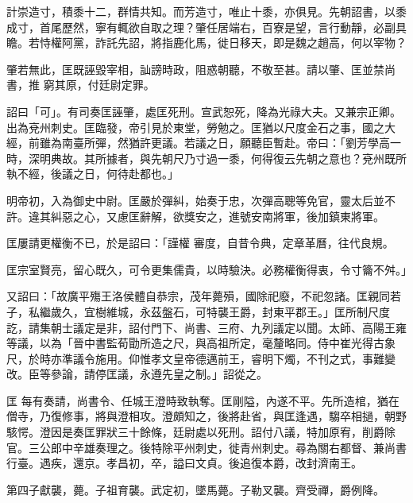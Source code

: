 \begin{pinyinscope}
 計崇造寸，積黍十二，群情共知。而芳造寸，唯止十黍，亦俱見。先朝詔書，以黍成寸，首尾歷然，寧有輒欲自取之理？肇任居端右，百寮是望，言行動靜，必副具瞻。若恃權阿黨，詐託先詔，將指鹿化馬，徙日移天，即是魏之趙高，何以宰物？



 肇若無此，匡既誣毀宰相，訕謗時政，阻惑朝聽，不敬至甚。請以肇、匡並禁尚書，推
 窮其原，付廷尉定罪。



 詔曰「可」。有司奏匡誣肇，處匡死刑。宣武恕死，降為光祿大夫。又兼宗正卿。出為兗州刺史。匡臨發，帝引見於東堂，勞勉之。匡猶以尺度金石之事，國之大經，前雖為南臺所彈，然猶許更議。若議之日，願聽臣暫赴。帝曰：「劉芳學高一時，深明典故。其所據者，與先朝尺乃寸過一黍，何得復云先朝之意也？兗州既所執不經，後議之日，何待赴都也。」



 明帝初，入為御史中尉。匡嚴於彈糾，始奏于忠，次彈高聰等免官，靈太后並不許。違其糾惡之心，又慮匡辭解，欲獎安之，進號安南將軍，後加鎮東將軍。



 匡屢請更權衡不已，於是詔曰：「謹權
 審度，自昔令典，定章革曆，往代良規。



 匡宗室賢亮，留心既久，可令更集儒貴，以時驗決。必務權衡得衷，令寸籥不舛。」



 又詔曰：「故廣平殤王洛侯體自恭宗，茂年薨殞，國除祀廢，不祀忽諸。匡親同若子，私繼歲久，宜樹維城，永茲盤石，可特襲王爵，封東平郡王。」匡所制尺度訖，請集朝士議定是非，詔付門下、尚書、三府、九列議定以聞。太師、高陽王雍等議，以為「晉中書監荀勖所造之尺，與高祖所定，毫釐略同。侍中崔光得古象尺，於時亦準議令施用。仰惟孝文皇帝德邁前王，睿明下燭，不刊之式，事難變改。臣等參論，請停匡議，永遵先皇之制。」詔從之。



 匡
 每有奏請，尚書令、任城王澄時致執奪。匡剛隘，內遂不平。先所造棺，猶在僧寺，乃復修事，將與澄相攻。澄頗知之，後將赴省，與匡逢遇，騶卒相撾，朝野駭愕。澄因是奏匡罪狀三十餘條，廷尉處以死刑。詔付八議，特加原宥，削爵除官。三公郎中辛雄奏理之。後特除平州刺史，徙青州刺史。尋為關右都督、兼尚書行臺。遇疾，還京。孝昌初，卒，謚曰文貞。後追復本爵，改封濟南王。



 第四子獻襲，薨。子祖育襲。武定初，墜馬薨。子勒叉襲。齊受禪，爵例降。



\end{pinyinscope}
